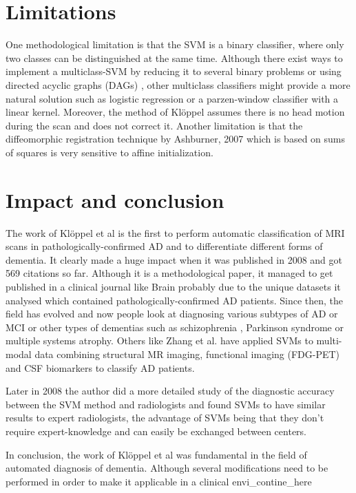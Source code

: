 \documentclass[11pt,a4paper,oneside]{report}
\begin{document}
\section*{Limitations}


One methodological limitation is that the SVM is a binary classifier, where only two classes can be distinguished at the same time. Although there exist ways to implement a multiclass-SVM by reducing it to several binary problems \cite{duan2005best} or using directed acyclic graphs (DAGs) \cite{platt1999large}, other multiclass classifiers might provide a more natural solution such as logistic regression \cite{desikan2009automated} or a parzen-window classifier with a linear kernel. \cite{shawe2004kernel} Moreover, the method of Kl\"{o}ppel assumes there is no head motion during the scan and does not correct it. Another limitation is that the diffeomorphic registration technique by Ashburner, 2007 \cite{ashburner2007fast} which is based on sums of squares is very sensitive to affine initialization. \cite{avants2011reproducible}

\section*{Impact and conclusion}

The work of Kl\"{o}ppel et al is the first to perform automatic classification of MRI scans in pathologically-confirmed AD and to differentiate different forms of dementia. It clearly made a huge impact when it was published in 2008 and got 569 citations so far. Although it is a methodological paper, it managed to get published in a clinical journal like Brain probably due to the unique datasets it analysed which contained pathologically-confirmed AD patients. Since then, the field has evolved and now people look at diagnosing various subtypes of AD or MCI \cite{haller2013individual} or other types of dementias such as schizophrenia \cite{ardekani2011diffusion}, Parkinson syndrome \cite{focke2011individual} or multiple systems atrophy. \cite{focke2011individual} Others like Zhang et al. have applied SVMs to multi-modal data combining structural MR imaging, functional imaging (FDG-PET) and CSF biomarkers to classify AD patients. \cite{zhang2011multimodal}

Later in 2008 the author did a more detailed study of the diagnostic accuracy between the SVM method and radiologists and found SVMs to have similar results to expert radiologists, the advantage of SVMs being that they don't require expert-knowledge and can easily be exchanged between centers. \cite{kloppel2008accuracy}


In conclusion, the work of Kl\"{o}ppel et al \cite{kloppel2008automatic} was fundamental in the field of automated diagnosis of dementia. Although several modifications need to be performed in order to make it applicable in a clinical envi_contine_here

\nocite{*} %


\end{document}
